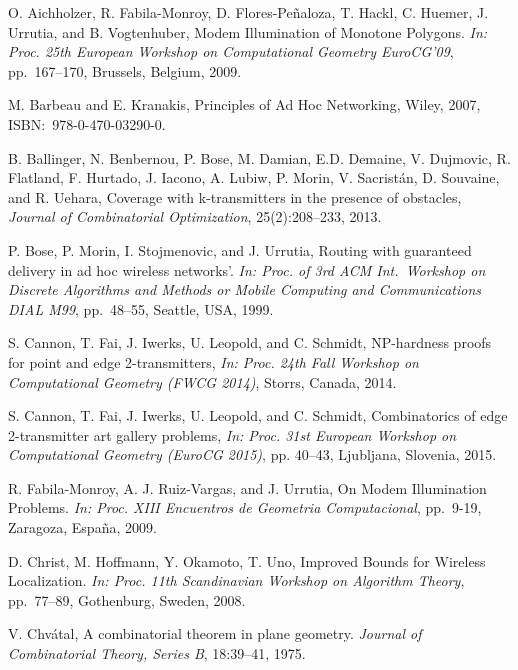 \documentclass[A4]{article}
\begin{document}
\begin{thebibliography}{}

	O. Aichholzer, R. Fabila-Monroy, D. Flores-Pe\~naloza, T. Hackl, C. Huemer, J. Urrutia, and B. Vogtenhuber, 
	Modem Illumination of Monotone Polygons. 
	\emph{In: Proc. 25th European Workshop on Computational Geometry EuroCG'09}, 
	pp.~167--170, Brussels, Belgium, 2009.



 M. Barbeau and E. Kranakis, 
	Principles of Ad Hoc Networking, 
	Wiley, 2007, ISBN:~978-0-470-03290-0. 

	B. Ballinger, N. Benbernou, P. Bose, M. Damian, E.D. Demaine, V. Dujmovic, R. Flatland, F. Hurtado, J. Iacono, A. Lubiw, P. Morin, V. Sacrist\'an, D. Souvaine, and R. Uehara, 
	Coverage with k-transmitters in the presence of obstacles, 
	\emph{Journal of Combinatorial Optimization}, 25(2):208--233, 2013.

	P. Bose, P. Morin, I. Stojmenovic, and J. Urrutia,
    Routing with guaranteed delivery in ad hoc wireless networks'. 
	\emph{In: Proc. of 3rd ACM Int.\ Workshop on Discrete Algorithms and Methods or Mobile Computing and Communications DIAL M99}, 
	pp.~48--55, Seattle, USA, 1999.
 
	S. Cannon, T. Fai, J. Iwerks, U. Leopold, and C. Schmidt, 
NP-hardness proofs for point and edge 2-transmitters,
\emph{In: Proc. 24th Fall Workshop on Computational Geometry (FWCG 2014)}, 
Storrs, Canada, 2014.

	S. Cannon, T. Fai, J. Iwerks, U. Leopold, and C. Schmidt, 
	Combinatorics of edge 2-transmitter art gallery problems,
	\emph{In: Proc. 31st European Workshop on Computational Geometry (EuroCG 2015)}, 
	pp. 40--43, 
	Ljubljana, Slovenia, 2015.

R. Fabila-Monroy, A. J. Ruiz-Vargas, and J. Urrutia, 
	On Modem Illumination Problems. 
	\emph{In: Proc. XIII Encuentros de Geometria Computacional}, 
	pp.~9-19, 
	Zaragoza, Espa\~na, 
2009. 



	D. Christ, M. Hoffmann, Y. Okamoto, T. Uno,
	Improved Bounds for Wireless Localization.
	\emph{In: Proc. 11th Scandinavian Workshop on Algorithm Theory}, 
	pp.~77--89, 
	Gothenburg, Sweden, 2008. 

	V. Chv\'atal,
	A combinatorial theorem in plane geometry. 
	\emph{Journal of Combinatorial Theory, Series B}, 18:39--41, 1975. 


\end{thebibliography}
\end{document}
